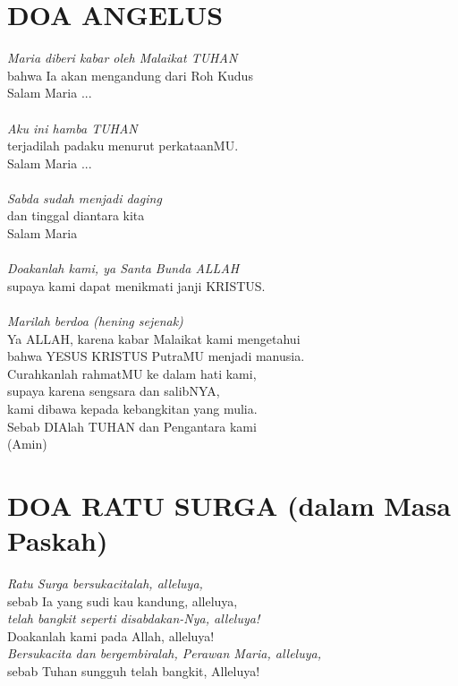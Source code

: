 \section{DOA ANGELUS}

\emph{Maria diberi kabar oleh Malaikat TUHAN} \\
bahwa Ia akan mengandung dari Roh Kudus \\
Salam Maria ...\\ \\
\emph{Aku ini hamba TUHAN}\\
terjadilah padaku menurut perkataanMU.\\
Salam Maria ... \\ \\
\emph{Sabda sudah menjadi daging}\\
dan tinggal diantara kita\\
Salam Maria\\ \\
\emph{Doakanlah kami, ya Santa Bunda ALLAH}\\
supaya kami dapat menikmati janji KRISTUS.\\ \\

\emph{Marilah berdoa (hening sejenak)}\\
Ya ALLAH, karena kabar Malaikat kami mengetahui\\
bahwa YESUS KRISTUS PutraMU menjadi manusia.\\
Curahkanlah rahmatMU ke dalam hati kami,\\
supaya karena sengsara dan salibNYA,\\
kami dibawa kepada kebangkitan yang mulia.\\
Sebab DIAlah TUHAN dan Pengantara kami \\
(Amin)\\

\section{DOA RATU SURGA (dalam Masa Paskah)}

\emph{Ratu Surga bersukacitalah, alleluya,}\\
sebab Ia yang sudi kau kandung, alleluya,\\
\emph{telah bangkit seperti disabdakan-Nya, alleluya!}\\
Doakanlah kami pada Allah, alleluya!\\
\emph{Bersukacita dan bergembiralah, Perawan Maria, alleluya,}\\
sebab Tuhan sungguh telah bangkit, Alleluya!\\

